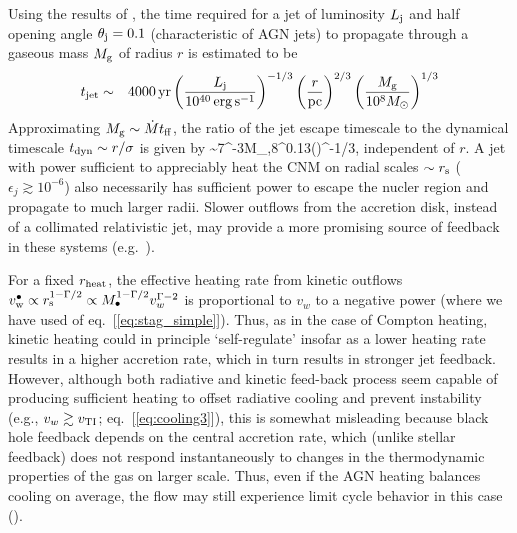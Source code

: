 \documentclass[usenatbib,fleqn]{mn2e}
\begin{document}
Using the results of \citet{Bromberg+11}, the time required for a jet of luminosity $L_{\rm
  j}$ and half opening angle $\theta_{\rm j} = 0.1$ (characteristic of
AGN jets) to propagate through a gaseous mass $M_{\rm g}$ of radius $r$ is estimated to be
\begin{eqnarray}
t_{\rm jet} &\sim& 4000\,{\rm yr}\left(\frac{{L}_{\rm j}}{10^{40}\,\rm erg\,s^{-1}}\right)^{-1/3}\left(\frac{r}{\rm pc}\right)^{2/3}\left(\frac{M_{\rm g}}{10^{8}M_{\odot}}\right)^{1/3} 
\end{eqnarray}
Approximating $M_{\rm g} \sim \dot{M}t_{\rm ff}$, the ratio of the jet escape timescale to the dynamical timescale $t_{\rm dyn} \sim r/\sigma$ is given by
\be
{} \sim 7^{-3}M_{\bullet,8}^{0.13}\left(\right)^{-1/3},
\ee
independent of $r$.  A jet with power sufficient to appreciably heat the CNM on radial scales $\sim r_{\rm s}$ ($\epsilon_{j} \gtrsim 10^{-6}$) also necessarily has sufficient power to escape the nucler region and propagate to much larger radii.  Slower outflows from the accretion disk, instead of a collimated relativistic jet, may provide a more promising source of feedback in these systems (e.g.~\citealt{Li+13}).    

For a fixed $r_{\rm heat}$, the effective heating rate from kinetic outflows $v_{\rm w}^{\bullet} \propto r_{\rm s}^{1-\Gamma/2} \propto M_{\bullet}^{1-\Gamma/2}v_{w}^{\Gamma-2}$ is proportional to $v_{w}$
to a negative power (where we have used of eq.~[\ref{eq:stag_simple}]).  Thus, as in the case of Compton heating, kinetic heating could in principle  `self-regulate' insofar as a lower heating rate results in a higher accretion rate, which in turn results in stronger jet feedback.  
However, although both radiative and kinetic feed-back process seem capable of producing sufficient heating to offset radiative cooling and prevent instability (e.g., $v_w \gtrsim v_{\rm TI}$; eq.~[\ref{eq:cooling3}]), this is somewhat misleading because black hole feedback depends on the central accretion rate, which (unlike stellar feedback) does not respond instantaneously to changes in the thermodynamic properties of the gas on larger scale.  Thus, even if the AGN heating balances cooling on average, the flow may still experience limit cycle behavior in this case (\citealt{Yuan&Li11}).   
\end{document}
